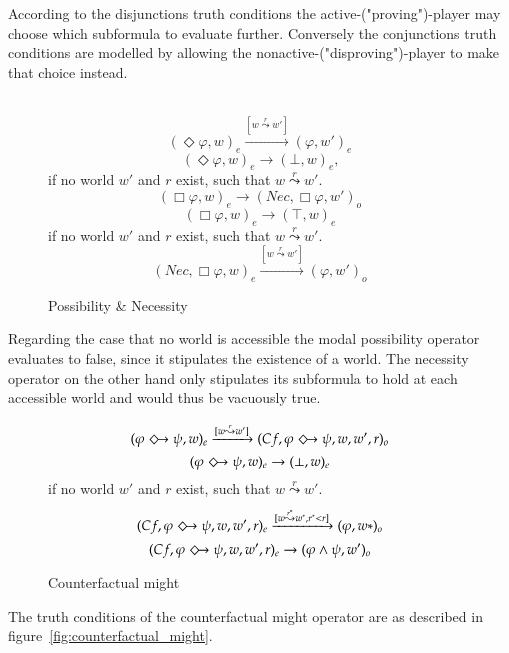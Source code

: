 \documentclass[a4paper,american]{paper}
\theoremstyle{definition}\newtheorem{definition}{Definition}
\begin{document}
	According to the disjunctions truth conditions the active-("proving")-player may choose which subformula to evaluate further. Conversely the conjunctions truth conditions are modelled by allowing the nonactive-("disproving")-player to make that choice instead. \\\\
	
\begin{figure}[H]
	\centering
	\begin{equation}
		(\Diamond\varphi ,w)_e\xrightarrow{[w\overset{r}{\leadsto}w']} (\varphi ,w')_{e}
	\end{equation}
	\begin{equation}
		(\Diamond\varphi ,w)_e\rightarrow (\bot ,w)_{e}\text{,}
	\end{equation}
	if no world $w'$ and $r$ exist, such that $w\overset{r}{\leadsto}w'$.
	\begin{equation}
		(\Box\varphi ,w)_e\rightarrow (Nec,\Box\varphi ,w')_{o}
	\end{equation}
	\begin{equation}
		(\Box\varphi ,w)_e\rightarrow (\top ,w)_{e}
	\end{equation}
	if no world $w'$ and $r$ exist, such that $w\overset{r}{\leadsto}w'$.
	\begin{equation}
		(Nec, \Box\varphi ,w)_e\xrightarrow{[w\overset{r}{\leadsto}w']} (\varphi ,w')_{o}
	\end{equation}
	\caption{Possibility \& Necessity}
	\label{fig:modal_operator_rules}
\end{figure}

	Regarding the case that no world is accessible the modal possibility operator evaluates to false, since it stipulates the existence of a world. The necessity operator on the other hand only stipulates its subformula to hold at each accessible world and would thus be vacuously true.
\begin{figure}[H]
	\centering
	\begin{equation}
		(\varphi\Diamondright\psi ,w)_e\xrightarrow{[w\overset{r}{\leadsto}w']} (Cf,\varphi\Diamondright\psi ,w,w',r)_o
	\end{equation}
	\begin{equation}
		(\varphi\Diamondright\psi ,w)_e\rightarrow (\bot ,w)_e
	\end{equation}
	if no world $w'$ and $r$ exist, such that $w\overset{r}{\leadsto}w'$.
	\begin{equation}
		(Cf,\varphi\Diamondright\psi ,w,w',r)_e\xrightarrow{[w\overset{r^*}{\leadsto}w^*,r^*< r]} (\varphi ,w*)_o
	\end{equation}
	\begin{equation}
		(Cf,\varphi\Diamondright\psi ,w,w',r)_e\rightarrow (\varphi\wedge\psi ,w')_o
	\end{equation}
	\caption{Counterfactual might}
	\label{fig:counterfactual_might_rules}
\end{figure}
	The truth conditions of the counterfactual might operator are as described in figure~\ref{fig:counterfactual_might}.
	
\end{document}
